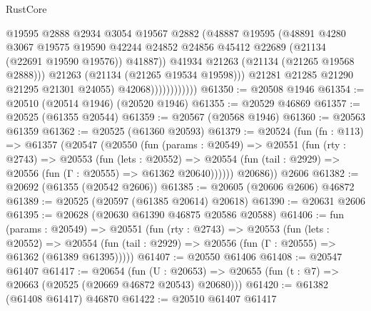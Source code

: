 \begin{lexlean}{RustCore}
\begin{coremodule}
                                  @19595
                                  @2888
                                  @2934
                                  @3054
                                  @19567
                                  @2882
                                  (@48887
                                    @19595
                                    (@48891
                                      @4280
                                      @3067
                                      @19575
                                      @19590
                                      @42244
                                      @24852
                                      @24856
                                      @45412
                                      @22689
                                      (@21134 (@22691 @19590 @19576))
                                      @41887))
                                  @41934
                                  @21263
                                  (@21134 (@21265 @19568 @2888)))
                                @21263
                                (@21134 (@21265 @19534 @19598)))
                              @21281
                              @21285
                              @21290
                              @21295
                              @21301
                              @24055)
                            @42068))))))))))))
@61350 := @20508 @1946
@61354 := @20510 (@20514 @1946) (@20520 @1946)
@61355 := @20529 @46869
@61357 := @20525 (@61355 @20544)
@61359 := @20567 (@20568 @1946)
@61360 := @20563 @61359
@61362 := @20525 (@61360 @20593)
@61379 := @20524
    (fun (fn : @113) =>
    @61357
      (@20547
        (@20550
          (fun (params : @20549) =>
          @20551
            (fun (rty : @2743) =>
            @20553
              (fun (lets : @20552) =>
              @20554 (fun (tail : @2929) => @20556 (fun (Γ : @20555) => @61362 @20640))))))
        @20686))
    @2606
@61382 := @20692 (@61355 (@20542 @2606))
@61385 := @20605 (@20606 @2606) @46872
@61389 := @20525 (@20597 (@61385 @20614) @20618)
@61390 := @20631 @2606
@61395 := @20628 (@20630 @61390 @46875 @20586 @20588)
@61406 := fun (params : @20549) =>
  @20551
    (fun (rty : @2743) =>
    @20553
      (fun (lets : @20552) =>
      @20554 (fun (tail : @2929) => @20556 (fun (Γ : @20555) => @61362 (@61389 @61395)))))
@61407 := @20550 @61406
@61408 := @20547 @61407
@61417 := @20654
    (fun (U : @20653) => @20655 (fun (t : @7) => @20663 (@20525 (@20669 @46872 @20543) @20680)))
@61420 := @61382 (@61408 @61417) @46870
@61422 := @20510 @61407 @61417

\end{coremodule}
\end{lexlean}
